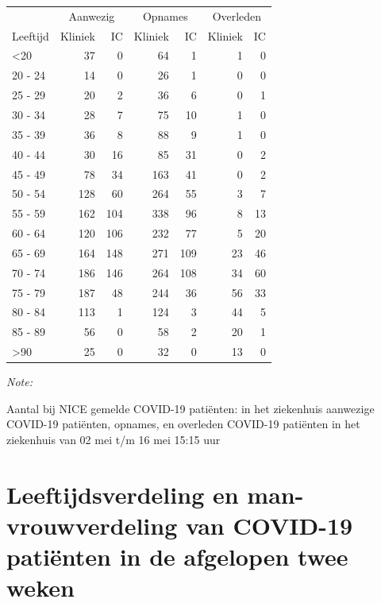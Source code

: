 \documentclass[
  english,
  man,floatsintext]{apa6}
\begin{document}
\begin{table}
\centering\begingroup\fontsize{10}{12}\selectfont

\begin{threeparttable}
\begin{tabular}{lrrrrrr}
\toprule
\multicolumn{1}{c}{ } & \multicolumn{2}{c}{Aanwezig} & \multicolumn{2}{c}{Opnames} & \multicolumn{2}{c}{Overleden} \\
\cmidrule(l{3pt}r{3pt}){2-3} \cmidrule(l{3pt}r{3pt}){4-5} \cmidrule(l{3pt}r{3pt}){6-7}
Leeftijd & Kliniek & IC & Kliniek & IC & Kliniek & IC\\
\midrule
<20 & 37 & 0 & 64 & 1 & 1 & 0\\
20 - 24 & 14 & 0 & 26 & 1 & 0 & 0\\
25 - 29 & 20 & 2 & 36 & 6 & 0 & 1\\
30 - 34 & 28 & 7 & 75 & 10 & 1 & 0\\
35 - 39 & 36 & 8 & 88 & 9 & 1 & 0\\
40 - 44 & 30 & 16 & 85 & 31 & 0 & 2\\
45 - 49 & 78 & 34 & 163 & 41 & 0 & 2\\
50 - 54 & 128 & 60 & 264 & 55 & 3 & 7\\
55 - 59 & 162 & 104 & 338 & 96 & 8 & 13\\
60 - 64 & 120 & 106 & 232 & 77 & 5 & 20\\
65 - 69 & 164 & 148 & 271 & 109 & 23 & 46\\
70 - 74 & 186 & 146 & 264 & 108 & 34 & 60\\
75 - 79 & 187 & 48 & 244 & 36 & 56 & 33\\
80 - 84 & 113 & 1 & 124 & 3 & 44 & 5\\
85 - 89 & 56 & 0 & 58 & 2 & 20 & 1\\
>90 & 25 & 0 & 32 & 0 & 13 & 0\\
\bottomrule
\end{tabular}
\begin{tablenotes}
\item \textit{Note: } 
\item Aantal bij NICE gemelde COVID-19 patiënten: in het ziekenhuis aanwezige COVID-19 patiënten, opnames, en overleden COVID-19 patiënten in het ziekenhuis van 02 mei t/m 16 mei 15:15 uur
\end{tablenotes}
\end{threeparttable}
\endgroup{}
\end{table}

\newpage

\hypertarget{leeftijdsverdeling-en-man-vrouwverdeling-van-covid-19-patiuxebnten-in-de-afgelopen-twee-weken}{%
\section{Leeftijdsverdeling en man-vrouwverdeling van COVID-19 patiënten in de afgelopen twee weken}\label{leeftijdsverdeling-en-man-vrouwverdeling-van-covid-19-patiuxebnten-in-de-afgelopen-twee-weken}}
\end{document}
